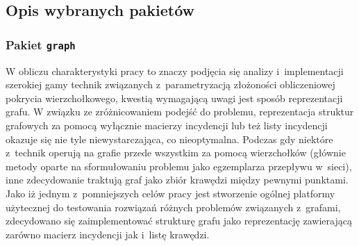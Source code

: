 \subsection{Opis wybranych pakietów}\label{ss_internals_important_packages}
\subsubsection{\textbf{Pakiet \texttt{graph}}}
\par{
  W obliczu charakterystyki pracy to znaczy podjęcia się analizy i~implementacji szerokiej gamy technik związanych z~parametryzacją złożoności obliczeniowej pokrycia wierzchołkowego, kwestią wymagającą uwagi jest sposób reprezentacji grafu.
  W związku ze zróżnicowaniem podejść do problemu, reprezentacja struktur grafowych za pomocą wyłącznie macierzy incydencji lub też listy incydencji okazuje się nie tyle niewystarczająca, co nieoptymalna.
  Podczas gdy niektóre z~technik operują na grafie przede wszystkim za pomocą wierzchołków (głównie metody oparte na sformułowaniu problemu jako egzemplarza przepływu w~sieci), inne zdecydowanie traktują graf jako zbiór krawędzi między pewnymi punktami.
  Jako iż jednym z~pomniejszych celów pracy jest stworzenie ogólnej platformy użytecznej do testowania rozwiązań różnych problemów związanych z~grafami, zdecydowano się zaimplementować strukturę grafu jako reprezentację zawierającą zarówno macierz incydencji jak i~listę krawędzi.
}

